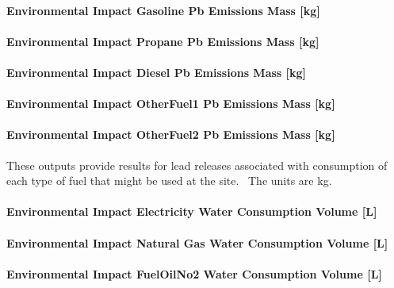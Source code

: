 \paragraph{Environmental Impact Gasoline Pb Emissions Mass {[}kg{]}}\label{environmental-impact-gasoline-pb-emissions-mass-kg}

\paragraph{Environmental Impact Propane Pb Emissions Mass {[}kg{]}}\label{environmental-impact-propane-pb-emissions-mass-kg}

\paragraph{Environmental Impact Diesel Pb Emissions Mass {[}kg{]}}\label{environmental-impact-diesel-pb-emissions-mass-kg}

\paragraph{Environmental Impact OtherFuel1 Pb Emissions Mass {[}kg{]}}\label{environmental-impact-otherfuel1-pb-emissions-mass-kg}

\paragraph{Environmental Impact OtherFuel2 Pb Emissions Mass {[}kg{]}}\label{environmental-impact-otherfuel2-pb-emissions-mass-kg}

These outputs provide results for lead releases associated with consumption of each type of fuel that might be used at the site.~ The units are kg.

\paragraph{Environmental Impact Electricity Water Consumption Volume {[}L{]}}\label{environmental-impact-electricity-water-consumption-volume-l}

\paragraph{Environmental Impact Natural Gas Water Consumption Volume {[}L{]}}\label{environmental-impact-natural-gas-water-consumption-volume-l}

\paragraph{Environmental Impact FuelOilNo2 Water Consumption Volume {[}L{]}}\label{environmental-impact-fuel-oil-2-water-consumption-volume-l}

